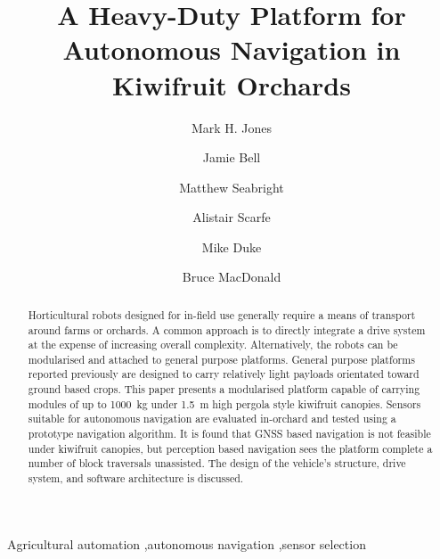 \documentclass[preprint,authoryear,12pt]{elsarticle}
\begin{document}
\begin{frontmatter}

\title{A Heavy-Duty Platform for Autonomous Navigation in Kiwifruit Orchards}

\author[UoW]{Mark H. Jones}

\author[UoA]{Jamie Bell}
\author[UoW]{Matthew Seabright}
\author[RPL]{Alistair Scarfe}
\author[UoW]{Mike Duke}
\author[UoA]{Bruce MacDonald}

\address[UoW]{School of Engineering, University of Waikato, Hamilton, New Zealand}
\address[UoA]{Faculty of Engineering, University of Auckland, Auckland, New Zealand}
\address[RPL]{Robotics Plus Ltd, Newnham Innovation Park, Tauranga, New Zealand}

\begin{abstract}
    Horticultural robots designed for in-field use generally require a means of transport around farms or orchards.
    A common approach is to directly integrate a drive system at the expense of increasing overall complexity.
    Alternatively, the robots can be modularised and attached to general purpose platforms.
    General purpose platforms reported previously are designed to carry relatively light payloads orientated toward ground based crops.
    This paper presents a modularised platform capable of carrying modules of up to \SI{1000}{\kilo\gram} under \SI{1.5}{\meter} high pergola style kiwifruit canopies.
    Sensors suitable for autonomous navigation are evaluated in-orchard and tested using a prototype navigation algorithm.
    It is found that GNSS based navigation is not feasible under kiwifruit canopies, but perception based navigation sees the platform complete a number of block traversals unassisted.
    The design of the vehicle's structure, drive system, and software architecture is discussed.

\end{abstract}

\begin{keyword}
    Agricultural automation \sep autonomous navigation \sep sensor selection
\end{keyword}

\end{frontmatter}

\end{document}
